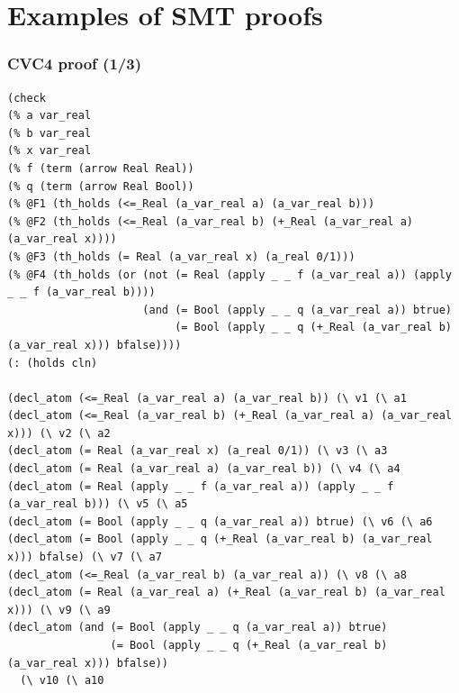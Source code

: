 \documentclass[svgnames,table,mathserif]{beamer}
\begin{document}

\section{Examples of SMT proofs}


\begin{frame}[fragile]
\frametitle{CVC4 proof (1/3)}

{\tiny
\begin{verbatim}
(check
(% a var_real
(% b var_real
(% x var_real
(% f (term (arrow Real Real))
(% q (term (arrow Real Bool))
(% @F1 (th_holds (<=_Real (a_var_real a) (a_var_real b)))
(% @F2 (th_holds (<=_Real (a_var_real b) (+_Real (a_var_real a) (a_var_real x))))
(% @F3 (th_holds (= Real (a_var_real x) (a_real 0/1)))
(% @F4 (th_holds (or (not (= Real (apply _ _ f (a_var_real a)) (apply _ _ f (a_var_real b)))) 
                     (and (= Bool (apply _ _ q (a_var_real a)) btrue)
                          (= Bool (apply _ _ q (+_Real (a_var_real b) (a_var_real x))) bfalse))))
(: (holds cln)

(decl_atom (<=_Real (a_var_real a) (a_var_real b)) (\ v1 (\ a1
(decl_atom (<=_Real (a_var_real b) (+_Real (a_var_real a) (a_var_real x))) (\ v2 (\ a2
(decl_atom (= Real (a_var_real x) (a_real 0/1)) (\ v3 (\ a3
(decl_atom (= Real (a_var_real a) (a_var_real b)) (\ v4 (\ a4
(decl_atom (= Real (apply _ _ f (a_var_real a)) (apply _ _ f (a_var_real b))) (\ v5 (\ a5
(decl_atom (= Bool (apply _ _ q (a_var_real a)) btrue) (\ v6 (\ a6
(decl_atom (= Bool (apply _ _ q (+_Real (a_var_real b) (a_var_real x))) bfalse) (\ v7 (\ a7
(decl_atom (<=_Real (a_var_real b) (a_var_real a)) (\ v8 (\ a8
(decl_atom (= Real (a_var_real a) (+_Real (a_var_real b) (a_var_real x))) (\ v9 (\ a9
(decl_atom (and (= Bool (apply _ _ q (a_var_real a)) btrue)
                (= Bool (apply _ _ q (+_Real (a_var_real b) (a_var_real x))) bfalse))
  (\ v10 (\ a10
\end{verbatim}
}
\end{frame}
\end{document}
